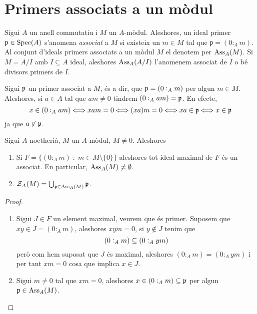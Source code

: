 \documentclass[../../../main.tex]{subfiles}
\begin{document}
\section{Primers associats a un mòdul}




\begin{defi}
\label{def:primerAssociat} Sigui $A$ un anell commutatiu i $M$ un $A$-mòdul. Aleshores, un ideal primer $\mathfrak{p}\in\mathrm{Spec}(A)$ s'anomena \textit{associat} a $M$ si existeix un $m\in M$ tal que $\mathfrak{p} = (0:_Am)$. Al conjunt d'ideals primers associats a un mòdul $M$ el denotem per $\operatorname{Ass}_A(M)$. Si $M = A/I$ amb $I\subseteq A$ ideal, aleshores $\operatorname{Ass}_A(A/I)$ l'anomenem associat de $I$ o bé divisors primers de $I$.
\end{defi}


\begin{nota}
Sigui $\mathfrak{p}$ un primer associat a $M$, és a dir, que $\mathfrak{p} = (0:_Am)$ per algun $m\in M$. Aleshores, si $a\in A$ tal que $am\neq 0$ tindrem $(0:_Aam) = \mathfrak{p}$. En efecte,
\begin{equation}
    \notag
    x\in (0:_Aam)\Longleftrightarrow xam=0\Longleftrightarrow (xa)m=0\Longleftrightarrow xa\in\mathfrak{p}\Longleftrightarrow x\in \mathfrak{p}
\end{equation}
ja que $a\not\in\mathfrak{p}$.
\end{nota}

\begin{ter}
\label{ter:noetheriaAssociats} Sigui $A$ noetherià, $M$ un $A$-mòdul, $M\not=0$. Aleshores
\begin{enumerate}[(1)]
    \item Si $F = \{(0:_Am)\;:\;m\in M\setminus\{0\}\}$ aleshores tot ideal maximal de $F$ és un associat. En particular, $\operatorname{Ass}_A(M)\not=\emptyset$.
    \item $\mathcal{Z}_A(M) = \bigcup_{\mathfrak{p}\in\operatorname{Ass}_A(M)}\mathfrak{p}$.
\end{enumerate}
\end{ter}
\begin{proof}
\begin{enumerate}[(1)]
    \item Sigui $J\in F$ un element maximal, veurem que és primer. Suposem que $xy\in J = (0:_Am)$, aleshores $xym = 0$, si $y\not\in J$ tenim que 
    \begin{equation}
        \notag
        (0:_Am)\subseteq(0:_Aym)
    \end{equation}
    però com hem suposat que $J$ és maximal, aleshores $(0:_Am) = (0:_Aym)$ i per tant $xm = 0$ cosa que implica $x\in J$.
    \item Sigui $m\not=0$ tal que $xm = 0$, aleshores $x\in (0:_Am)\subseteq\mathfrak{p}$ per algun $\mathfrak{p}\in\operatorname{Ass}_A(M)$.
\end{enumerate}
\end{proof}
\end{document}
